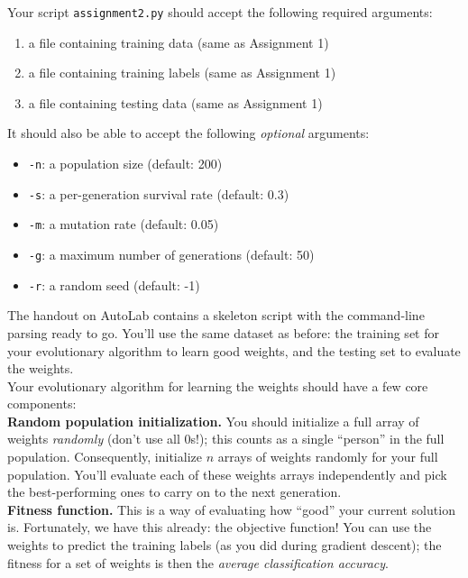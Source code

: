 \documentclass[paper=a4, fontsize=11pt]{scrartcl} %
\numberwithin{figure}{section} %
\numberwithin{table}{section} %
\begin{document}
Your script \texttt{assignment2.py} should accept the following required arguments:

\begin{enumerate}
	\item a file containing training data (same as Assignment 1)
	\item a file containing training labels (same as Assignment 1)
	\item a file containing testing data (same as Assignment 1)
\end{enumerate}

It should also be able to accept the following \emph{optional} arguments:

\begin{itemize}
	\item \texttt{-n}: a population size (default: 200)
	\item \texttt{-s}: a per-generation survival rate (default: 0.3)
	\item \texttt{-m}: a mutation rate (default: 0.05)
	\item \texttt{-g}: a maximum number of generations (default: 50)
	\item \texttt{-r}: a random seed (default: -1)
\end{itemize}

The handout on AutoLab contains a skeleton script with the command-line parsing ready to go. You'll use the same dataset as before: the training set for your evolutionary algorithm to learn good weights, and the testing set to evaluate the weights. \\

Your evolutionary algorithm for learning the weights should have a few core components: \\

\textbf{Random population initialization.} You should initialize a full array of weights \emph{randomly} (don't use all 0s!); this counts as a single ``person'' in the full population. Consequently, initialize $n$ arrays of weights randomly for your full population. You'll evaluate each of these weights arrays independently and pick the best-performing ones to carry on to the next generation. \\

\textbf{Fitness function.} This is a way of evaluating how ``good'' your current solution is. Fortunately, we have this already: the objective function! You can use the weights to predict the training labels (as you did during gradient descent); the fitness for a set of weights is then the \emph{average classification accuracy}. \\
\end{document}
